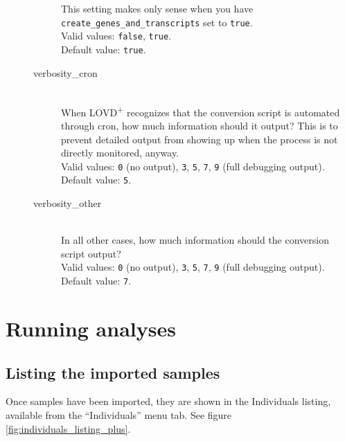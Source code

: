 \begin{description}
\begin{description}
      This setting makes only sense when you have \texttt{create\_genes\_and\_transcripts} set to \texttt{true}.\\
      Valid values: \texttt{false}, \texttt{true}.\\
      Default value: \texttt{true}.
    \item[verbosity\_cron] \hfill \\
      When LOVD\textsuperscript{+} recognizes that the conversion script is automated through cron,
       how much information should it output?
      This is to prevent detailed output from showing up when the process is not directly monitored, anyway.\\
      Valid values: \texttt{0} (no output), \texttt{3}, \texttt{5}, \texttt{7}, \texttt{9} (full debugging output).\\
      Default value: \texttt{5}.
    \item[verbosity\_other] \hfill \\
      In all other cases, how much information should the conversion script output?\\
      Valid values: \texttt{0} (no output), \texttt{3}, \texttt{5}, \texttt{7}, \texttt{9} (full debugging output).\\
      Default value: \texttt{7}.
  \end{description}
\end{description}










\chapter{Running analyses}
\label{chap:running_analyses}
\section{Listing the imported samples}
\label{sec:running_analyses_data_listing}

Once samples have been imported, they are shown in the Individuals listing,
 available from the ``Individuals'' menu tab.
See figure \ref{fig:individuals_listing_plus}.

